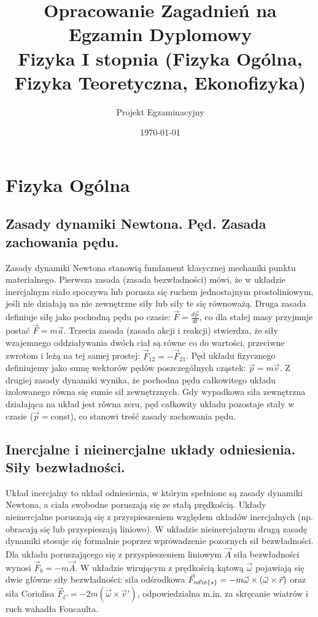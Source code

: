 \documentclass[11pt,a4paper]{article}
\title{\textbf{Opracowanie Zagadnień na Egzamin Dyplomowy}\\ \large Fizyka I stopnia (Fizyka Ogólna, Fizyka Teoretyczna, Ekonofizyka)}
\author{Projekt Egzaminacyjny}
\date{\today}
\begin{document}
\maketitle
\tableofcontents
\newpage

\section{Fizyka Ogólna}

\subsection{Zasady dynamiki Newtona. Pęd. Zasada zachowania pędu.}
Zasady dynamiki Newtona stanowią fundament klasycznej mechaniki punktu materialnego. Pierwsza zasada (zasada bezwładności) mówi, że w układzie inercjalnym ciało spoczywa lub porusza się ruchem jednostajnym prostoliniowym, jeśli nie działają na nie zewnętrzne siły lub siły te się równoważą. Druga zasada definiuje siłę jako pochodną pędu po czasie: $\vec{F} = \frac{d\vec{p}}{dt}$, co dla stałej masy przyjmuje postać $\vec{F} = m\vec{a}$. Trzecia zasada (zasada akcji i reakcji) stwierdza, że siły wzajemnego oddziaływania dwóch ciał są równe co do wartości, przeciwne zwrotom i leżą na tej samej prostej: $\vec{F}_{12} = -\vec{F}_{21}$. 
Pęd układu fizycznego definiujemy jako sumę wektorów pędów poszczególnych cząstek: $\vec{p} = m\vec{v}$. Z drugiej zasady dynamiki wynika, że pochodna pędu całkowitego układu izolowanego równa się sumie sił zewnętrznych. Gdy wypadkowa siła zewnętrzna działająca na układ jest równa zeru, pęd całkowity układu pozostaje stały w czasie ($\vec{p} = \text{const}$), co stanowi treść zasady zachowania pędu.

\subsection{Inercjalne i nieinercjalne układy odniesienia. Siły bezwładności.}
Układ inercjalny to układ odniesienia, w którym spełnione są zasady dynamiki Newtona, a ciała swobodne poruszają się ze stałą prędkością. Układy nieinercjalne poruszają się z przyspieszeniem względem układów inercjalnych (np. obracają się lub przyspieszają liniowo). W układzie nieinercjalnym drugą zasadę dynamiki stosuje się formalnie poprzez wprowadzenie pozornych sił bezwładności. 
Dla układu poruszającego się z przyspieszeniem liniowym $\vec{A}$ siła bezwładności wynosi $\vec{F}_{b} = -m\vec{A}$. W układzie wirującym z prędkością kątową $\vec{\omega}$ pojawiają się dwie główne siły bezwładności: siła odśrodkowa $\vec{F}_{od\c{s}} = -m\vec{\omega} \times (\vec{\omega} \times \vec{r})$ oraz siła Coriolisa $\vec{F}_{C} = -2m(\vec{\omega} \times \vec{v}')$, odpowiedzialna m.in. za skręcanie wiatrów i ruch wahadła Foucaulta.
\end{document}
